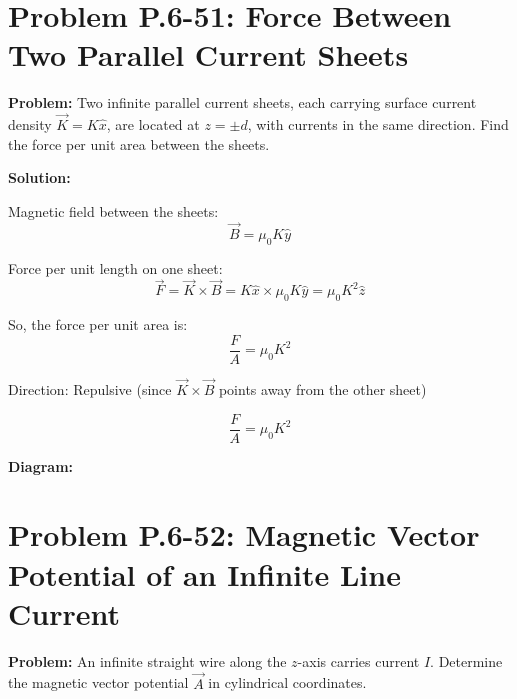 \documentclass[12pt]{article}
\begin{document}
\section*{Problem P.6-51: Force Between Two Parallel Current Sheets}

\textbf{Problem:}  
Two infinite parallel current sheets, each carrying surface current density \( \vec{K} = K \hat{x} \), are located at \( z = \pm d \), with currents in the same direction. Find the force per unit area between the sheets.

\textbf{Solution:}

Magnetic field between the sheets:
\[
\vec{B} = \mu_0 K \hat{y}
\]

Force per unit length on one sheet:
\[
\vec{F} = \vec{K} \times \vec{B} = K \hat{x} \times \mu_0 K \hat{y} = \mu_0 K^2 \hat{z}
\]

So, the force per unit area is:
\[
\frac{F}{A} = \mu_0 K^2
\]

Direction: Repulsive (since \( \vec{K} \times \vec{B} \) points away from the other sheet)

\begin{tcolorbox}
\[
\boxed{\frac{F}{A} = \mu_0 K^2}
\]
\end{tcolorbox}

\textbf{Diagram:}
\begin{center}
\end{center}



\section*{Problem P.6-52: Magnetic Vector Potential of an Infinite Line Current}

\textbf{Problem:}  
An infinite straight wire along the \( z \)-axis carries current \( I \). Determine the magnetic vector potential \( \vec{A} \) in cylindrical coordinates.
\end{document}

